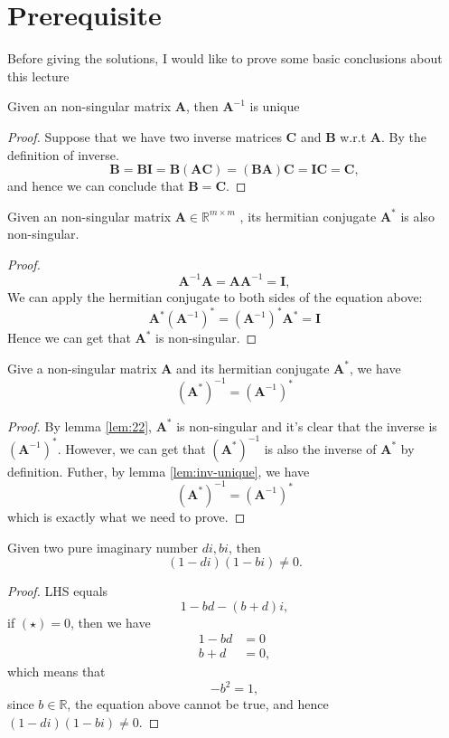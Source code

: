 \section{Prerequisite}
    Before giving the solutions, I would like to prove some basic conclusions about this lecture
    \begin{lemma}
        Given an non-singular matrix $\bm{A}$, then $\bm{A}^{-1}$ is unique
        \begin{proof}
        Suppose that we have two inverse matrices $\bm{C}$ and $\bm{B}$ w.r.t $\bm{A}$. By the definition of inverse. 
        \[\bm{B} =\bm{BI} = \bm{B(AC)} = \bm{(BA)C} = \bm{IC} = \bm{C},\]
        and hence we can conclude that $\bm{B} = \bm{C}$.
        \end{proof}
        \label{lem:inv-unique}
    \end{lemma} 
    
    \begin{lemma}
        Given an non-singular matrix $\bm{A} \in \mathbb{R}^{m\times m}$ , its hermitian conjugate $\bm{A}^{*}$ is also non-singular.
        \begin{proof}
            \[\bm{A}^{-1}\bm{A} = \bm{A}\bm{A}^{-1} = \bm{I},\]
        We can apply the hermitian conjugate to both sides of the equation above:
            \[ \bm{A}^{*} (\bm{A}^{-1})^{*} = (\bm{A}^{-1})^{*}\bm{A}^{*} =  \bm{I}\]
        Hence we can get that $\bm{A}^{*}$ is non-singular.
        \end{proof}
        \label{lem:22}
    \end{lemma} 
    
    \begin{lemma}
    Give a non-singular matrix $\bm{A}$ and its hermitian conjugate $\bm{A}^{*}$, we have
    \[(\bm{A}^{*})^{-1} = (\bm{A}^{-1})^{*}\]
    \end{lemma}
    \begin{proof}
    By lemma \ref{lem:22}, $\bm{A}^{*}$ is non-singular and it's clear that the inverse is $(\bm{A}^{-1})^{*}$. However, we can get that $(\bm{A}^{*})^{-1}$ is also the inverse of $\bm{A}^{*}$ by definition.
    Futher, by lemma \ref{lem:inv-unique}, we have
    $$
    (\bm{A}^{*})^{-1} = (\bm{A}^{-1})^{*}
    $$
    which is exactly what we need to prove.
    \end{proof}
    
    \begin{lemma}
    Given two pure imaginary number $di, bi$, then 
    $$
    (1-di) (1-bi) \neq 0.
    $$
    \begin{proof}
    LHS equals
    \begin{equation*}
    1-bd - (b+d)i, \tag{$\star$}
    \end{equation*}
    if $(\star) = 0$, then we have
    $$
    \begin{aligned}
    1 - bd &= 0 \\
    b+d &=0,
    \end{aligned}
    $$
    which means that
    $$
    -b^2 = 1,
    $$
    since $b \in \mathbb{R}$, the equation above cannot be true, and hence $(1-di)(1-bi) \neq 0$.
    \end{proof}
    \end{lemma}

